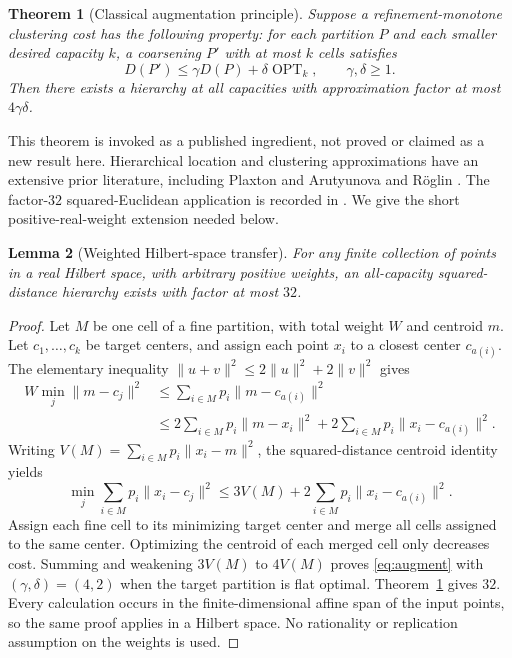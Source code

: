 \documentclass[11pt]{article}
\newtheorem{theorem}{Theorem}[section]
\newtheorem{lemma}[theorem]{Lemma}
\theoremstyle{definition}\newtheorem{definition}[theorem]{Definition}
\theoremstyle{remark}\newtheorem{remark}[theorem]{Remark}
\newcommand{\OPT}{\operatorname{OPT}}
\begin{document}
\begin{theorem}[Classical augmentation principle]
\label{thm:augmentation}
Suppose a refinement-monotone clustering cost has the following property: for each partition $P$ and each smaller desired capacity $k$, a coarsening $P'$ with at most $k$ cells satisfies
\begin{equation}
D(P')\le\gamma D(P)+\delta\OPT_k,\qquad \gamma,\delta\ge1.
\label{eq:augment}
\end{equation}
Then there exists a hierarchy at all capacities with approximation factor at most $4\gamma\delta$.
\end{theorem}
This theorem is invoked as a published ingredient, not proved or claimed as a new result here. Hierarchical location and clustering approximations have an extensive prior literature, including Plaxton \cite{plaxton} and Arutyunova and R\"oglin \cite{arutyunova}. The factor-$32$ squared-Euclidean application is recorded in \cite[Lemma 2.13, pp.~30--31; Theorem 1.2, p.~32]{grosswendt}. We give the short positive-real-weight extension needed below.

\begin{lemma}[Weighted Hilbert-space transfer]
\label{lem:hilbert}
For any finite collection of points in a real Hilbert space, with arbitrary positive weights, an all-capacity squared-distance hierarchy exists with factor at most $32$.
\end{lemma}
\begin{proof}
Let $M$ be one cell of a fine partition, with total weight $W$ and centroid $m$. Let $c_1,\ldots,c_k$ be target centers, and assign each point $x_i$ to a closest center $c_{a(i)}$. The elementary inequality $\|u+v\|^2\le2\|u\|^2+2\|v\|^2$ gives
\begin{align*}
W\min_j\|m-c_j\|^2
&\le\sum_{i\in M}p_i\|m-c_{a(i)}\|^2\\
&\le 2\sum_{i\in M}p_i\|m-x_i\|^2
 +2\sum_{i\in M}p_i\|x_i-c_{a(i)}\|^2.
\end{align*}
Writing $V(M)=\sum_{i\in M}p_i\|x_i-m\|^2$, the squared-distance centroid identity yields
\[
\min_j\sum_{i\in M}p_i\|x_i-c_j\|^2
\le3V(M)+2\sum_{i\in M}p_i\|x_i-c_{a(i)}\|^2.
\]
Assign each fine cell to its minimizing target center and merge all cells assigned to the same center. Optimizing the centroid of each merged cell only decreases cost. Summing and weakening $3V(M)$ to $4V(M)$ proves \eqref{eq:augment} with $(\gamma,\delta)=(4,2)$ when the target partition is flat optimal. Theorem~\ref{thm:augmentation} gives $32$. Every calculation occurs in the finite-dimensional affine span of the input points, so the same proof applies in a Hilbert space. No rationality or replication assumption on the weights is used.
\end{proof}
\end{document}
